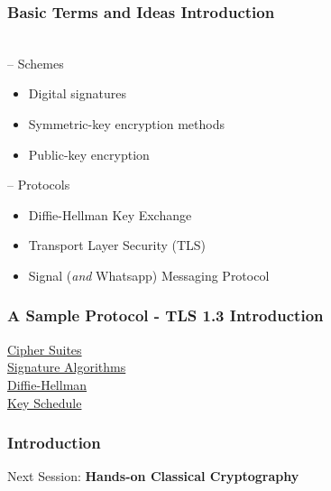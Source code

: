 \documentclass[12pt]{beamer}
\newcommand{\FrameTitle}[2]{\frametitle{#1 \hfill \small\textnormal{\textcolor{midgray}{#2}}}}
\newcommand{\nl}{\vspace*{1em}\\}
\newcommand{\vsp}{\vspace*{1em}}
\begin{document}
\begin{frame}\FrameTitle{Basic Terms and Ideas}{Introduction}
    {\large\color{Apricot}{Schemes and Protocols}}\nl

    -- Schemes
    \begin{itemize}
        \item Digital signatures
        \item Symmetric-key encryption methods
        \item Public-key encryption
    \end{itemize}
    \vsp
    -- Protocols
    \begin{itemize}
        \item Diffie-Hellman Key Exchange
        \item Transport Layer Security (TLS)
        \item Signal (\textit{and} Whatsapp) Messaging Protocol
    \end{itemize}
\end{frame}


\begin{frame}\FrameTitle{A Sample Protocol - TLS 1.3}{Introduction}
    \href{https://www.rfc-editor.org/rfc/rfc8446.html\#appendix-B.4}{Cipher Suites}\nl
    \href{https://www.rfc-editor.org/rfc/rfc8446.html\#appendix-B.3.1.3}{Signature Algorithms}\nl
    \href{https://www.rfc-editor.org/rfc/rfc8446.html\#section-7.4.2}{Diffie-Hellman}\nl
    \vspace*{1em}
    \href{https://www.rfc-editor.org/rfc/rfc8446.html\#page-93}{Key Schedule}\nl

\end{frame}

\begin{frame}\FrameTitle{}{Introduction}
    \vfill
    \vfill
    Next Session: \textbf{Hands-on Classical Cryptography}
\end{frame}
\end{document}
